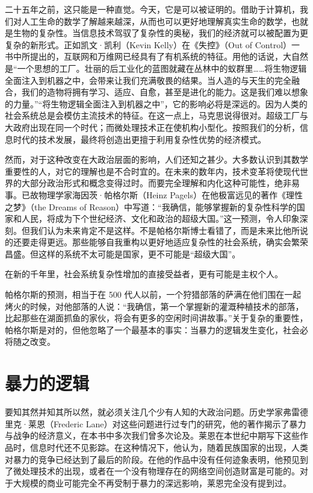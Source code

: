 二十五年之前，这只能是一种直觉。今天，它是可以被证明的。借助于计算机，我们对人工生命的数学了解越来越深，从而也可以更好地理解真实生命的数学，也就是生物的复杂性。当信息技术驾驭了复杂性的奥秘，我们的经济就可以被配置为更复杂的新形式。正如凯文·凯利（Kevin Kelly）在《失控》（Out of Control）一书中所提出的，互联网和万维网已经具有了有机系统的特征。用他的话说，大自然是“一个思想的工厂。壮丽的后工业化的蓝图就藏在丛林中的蚁群里……将生物逻辑全面注入到机器之中，会带来让我们充满敬畏的结果。当人造的与天生的完全融合，我们的造物将拥有学习、适应、自愈，甚至是进化的能力。这是我们难以想象的力量。”“将生物逻辑全面注入到机器之中”，它的影响必将是深远的。因为人类的社会系统总是会模仿主流技术的特征。在这一点上，马克思说得很对。超级工厂与大政府出现在同一个时代；而微处理技术正在使机构小型化。按照我们的分析，信息时代的技术发展，最终将创造出更擅于利用复杂性优势的经济模式。

然而，对于这种改变在大政治层面的影响，人们还知之甚少。大多数认识到其数学重要性的人，对它的理解也是不合时宜的。在未来的数年内，技术变革将使现代世界的大部分政治形式和概念变得过时。而要完全理解和内化这种可能性，绝非易事。已故物理学家海因茨·帕格尔斯（Heinz Pagels）在他极富远见的著作《理性之梦》（the Dreams of Reason）中写道：“我确信，能够掌握新的复杂性科学的国家和人民，将成为下个世纪经济、文化和政治的超级大国。”这一预测，令人印象深刻。但我们认为未来肯定不是这样。不是帕格尔斯博士看错了，而是未来比他所说的还要走得更远。那些能够自我重构以更好地适应复杂性的社会系统，确实会繁荣昌盛。但这样的系统不太可能是国家，更不可能是“超级大国”。

在新的千年里，社会系统复杂性增加的直接受益者，更有可能是主权个人。

帕格尔斯的预测，相当于在 500 代人以前，一个狩猎部落的萨满在他们围在一起烤火的时候，对他部落的人说：“我确信，第一个掌握新的灌溉种植技术的部落，比起那些在湖面抓鱼的家伙，将会有更多的空闲时间讲故事。”关于复杂的重要性，帕格尔斯是对的，但他忽略了一个最基本的事实：当暴力的逻辑发生变化，社会必将随之改变。

\section{暴力的逻辑}
要知其然并知其所以然，就必须关注几个少有人知的大政治问题。历史学家弗雷德里克·莱恩（Frederic Lane）对这些问题进行过专门的研究，他的著作揭示了暴力与战争的经济意义，在本书中多次我们曾多次论及。莱恩在本世纪中期写下这些作品时，信息时代还不见影踪。在这种情况下，他认为，随着民族国家的出现，人类对暴力的竞争已经达到了最后的阶段。在他的作品中没有任何迹象表明，他预见到了微处理技术的出现，或者在一个没有物理存在的网络空间创造财富是可能的。对于大规模的商业可能完全不再受制于暴力的深远影响，莱恩完全没有提到过。

